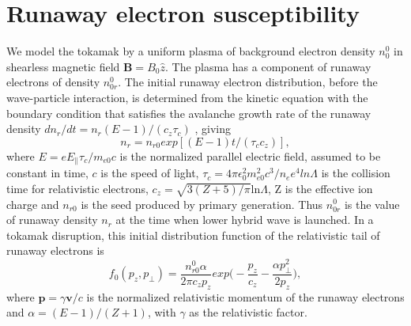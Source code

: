 \documentclass[aip,pop,amsmath,amssymb,showpacs,reprint,floatfix,lengthcheck]{revtex4-1}
\begin{document}
\section{Runaway electron susceptibility}
We model the tokamak by a uniform plasma of background electron density $n_{0}^{0}$ in shearless magnetic field $\textbf{B}=B_{0} \hat{z}$. The plasma has a component of runaway electrons of density $n_{0r}^0$. The initial runaway electron distribution, before the wave-particle interaction, is determined from the kinetic equation with the boundary condition that satisfies the avalanche growth rate of the runaway density $dn_{r}/dt = n_{r}(E-1)/(c_{z}\tau_{c})$ \cite{rosenbluth1997theory}, giving 
\begin{equation}
 n_{r}=n_{r0}exp[(E-1)t/(\tau_{c}c_{z})],
\end{equation}
where $E=eE_{\parallel}\tau_{c}/m_{e0}c$ is the normalized parallel electric field, assumed to be constant in time, $c$ is the speed of light, $\tau_{c}=4\pi\epsilon_{0}^2 m_{e0}^2 c^3/n_{e}e^4 ln \Lambda$ is the collision time for relativistic electrons, $c_{z}=\sqrt{3(Z+5)/\pi}$ln$\Lambda$, Z is the effective ion charge and $n_{r0}$ is the seed produced by primary generation. Thus $n_{0r}^0$ is the value of runaway density $n_{r}$ at the time when lower hybrid wave is launched. In a tokamak disruption, this initial distribution function of the relativistic tail of runaway electrons is \cite{pokol2008quasi,fulop2006destabilization}
\begin{equation}
 f_{0}(p_{z},p_{\perp})=\frac{n_{r0}^{0} \alpha}{2\pi c_{z}p_{z}}exp\biggl(-\frac{p_{z}}{c_{z}}-\frac{\alpha p_{\perp}^2}{2p_{z}}\biggr),
\end{equation}
where $\textbf{p}=\gamma \textbf{v}/c$ is the normalized relativistic momentum of the runaway electrons and $\alpha=(E-1)/(Z+1)$, with $\gamma$ as the relativistic factor.
\end{document}
